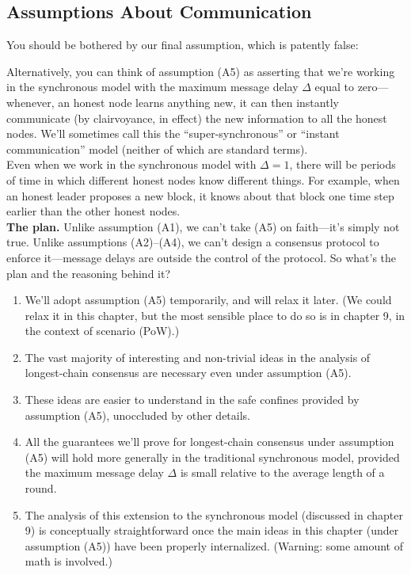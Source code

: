 \subsection{Assumptions About Communication}
You should be bothered by our final assumption, which is patently false:

Alternatively, you can think of assumption (A5) as asserting that we’re working in the
synchronous model with the maximum message delay $\Delta$ equal to zero—whenever, an honest
node learns anything new, it can then instantly communicate (by clairvoyance, in effect) the
new information to all the honest nodes. We’ll sometimes call this the “super-synchronous”
or “instant communication” model (neither of which are standard terms).\\
Even when we work in the synchronous model with $\Delta = 1$, there will be periods of time
in which different honest nodes know different things. For example, when an honest leader
proposes a new block, it knows about that block one time step earlier than the other honest
nodes.\\

\noindent
\textbf{The plan.} Unlike assumption (A1), we can’t take (A5) on faith—it’s simply not true.
Unlike assumptions (A2)–(A4), we can’t design a consensus protocol to enforce it—message
delays are outside the control of the protocol. So what’s the plan and the reasoning behind
it?
\begin{enumerate}
    \item We’ll adopt assumption (A5) temporarily, and will relax it later. (We could relax it
in this chapter, but the most sensible place to do so is in chapter 9, in the context of
scenario (PoW).)
    \item The vast majority of interesting and non-trivial ideas in the analysis of longest-chain
consensus are necessary even under assumption (A5).
    \item These ideas are easier to understand in the safe confines provided by assumption (A5),
unoccluded by other details.
    \item All the guarantees we’ll prove for longest-chain consensus under assumption (A5) will
hold more generally in the traditional synchronous model, provided the maximum message delay $\Delta$ is small relative to the average length of a round.
    \item The analysis of this extension to the synchronous model (discussed in chapter 9) is conceptually straightforward once the main ideas in this chapter (under assumption (A5)) have been properly internalized. (Warning: some amount of math is involved.)
\end{enumerate}

